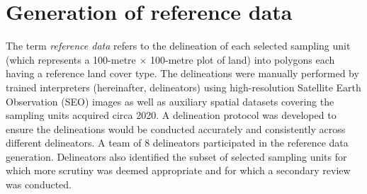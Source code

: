 

\section{Generation of reference data}


The term \textit{reference data} refers to
the delineation of each selected sampling unit
(which represents a 100-metre $\times$ 100-metre plot of land)
into polygons each having a reference land cover type.
The delineations were manually performed by trained interpreters (hereinafter, delineators) 
using high-resolution Satellite Earth Observation (SEO) images
as well as auxiliary spatial datasets
covering the sampling units acquired circa 2020.
A delineation protocol was developed to ensure the delineations
would be conducted accurately and consistently across different delineators.
A team of 8 delineators participated in the reference data generation.
Delineators also identified the subset of selected sampling units
for which more scrutiny was deemed appropriate and
for which a secondary review was conducted.


